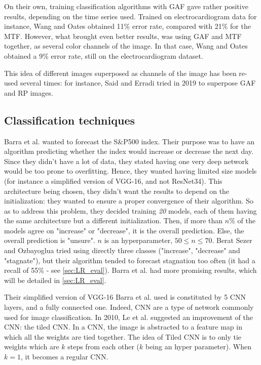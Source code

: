 \documentclass[11pt]{article}
\begin{document}
\begin{onehalfspace}
On their own, training classification algorithms with GAF gave rather positive results, depending on the time series used. Trained on electrocardiogram data for instance, Wang and Oates \cite{wang_encod} obtained 11\% error rate, compared with 21\% for the MTF. However, what brought even better results, was using GAF and MTF together, as several color channels of the image. In that case, Wang and Oates \cite{wang} obtained a 9\% error rate, still on the electrocardiogram dataset.

This idea of different images superposed as channels of the image has been re-used several times: for instance, Said and Erradi tried in 2019 \cite{said} to superpose GAF and RP images.

\subsection{Classification techniques}
\label{sec:LR_classif}

Barra et al. \cite{barra} wanted to forecast the S\&P500 index. Their purpose was to have an algorithm predicting whether the index would increase or decrease the next day. Since they didn't have a lot of data, they stated having one very deep network would be too prone to overfitting. Hence, they wanted having limited size models (for instance a simplified version of VGG-16, and not ResNet34). This architecture being chosen, they didn't want the results to depend on the initialization: they wanted to ensure a proper convergence of their algorithm. So as to address this problem, they decided training \emph{20} models, each of them having the same architecture but a different initialization. Then, if more than $n$\% of the models agree on "increase" or "decrease", it is the overall prediction. Else, the overall prediction is "unsure". $n$ is an hyperparameter, $50 \leq n \leq 70$. Berat Sezer and Ozbayoglua \cite{berat} tried using directly three classes ("increase", "decrease" and "stagnate"), but their algorithm tended to forecast stagnation too often (it had a recall of 55\% - see \ref{sec:LR_eval}). Barra et al. \cite{barra} had more promising results, which will be detailed in \ref{sec:LR_eval}.

Their simplified version of VGG-16 Barra et al. used is constituted by 5 CNN layers, and a fully connected one. Indeed, CNN are a type of network commonly used for image classification. In 2010, Le et al. \cite{le} suggested an improvement of the CNN: the tiled CNN. In a CNN, the image is abstracted to a feature map in which all the weights are tied together. The idea of Tiled CNN is to only tie weights which are $k$ steps from each other ($k$ being an hyper parameter). When $k = 1$, it becomes a regular CNN. 


\end{onehalfspace}
\end{document}
